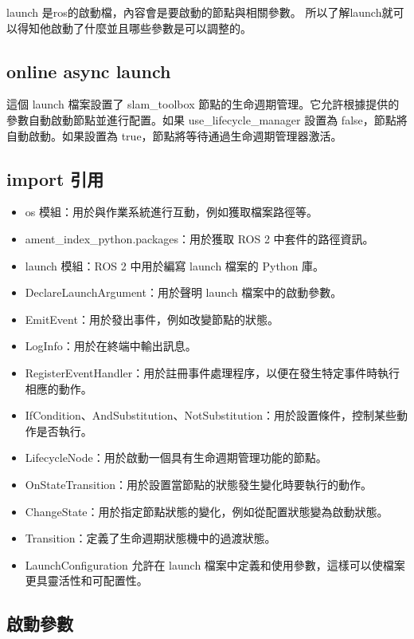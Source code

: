 launch 是ros的啟動檔，內容會是要啟動的節點與相關參數。
所以了解launch就可以得知他啟動了什麼並且哪些參數是可以調整的。
\subsection{online async launch}

這個 launch 檔案設置了 slam\_toolbox 節點的生命週期管理。它允許根據提供的參數自動啟動節點並進行配置。如果 use\_lifecycle\_manager 設置為 false，節點將自動啟動。如果設置為 true，節點將等待通過生命週期管理器激活。
\subsection{import 引用}
\begin{itemize}
    \item os 模組：用於與作業系統進行互動，例如獲取檔案路徑等。
    \item ament\_index\_python.packages：用於獲取 ROS 2 中套件的路徑資訊。
    \item launch 模組：ROS 2 中用於編寫 launch 檔案的 Python 庫。
    \item DeclareLaunchArgument：用於聲明 launch 檔案中的啟動參數。
    \item EmitEvent：用於發出事件，例如改變節點的狀態。
    \item LogInfo：用於在終端中輸出訊息。
    \item RegisterEventHandler：用於註冊事件處理程序，以便在發生特定事件時執行相應的動作。
    \item IfCondition、AndSubstitution、NotSubstitution：用於設置條件，控制某些動作是否執行。
    \item LifecycleNode：用於啟動一個具有生命週期管理功能的節點。
    \item OnStateTransition：用於設置當節點的狀態發生變化時要執行的動作。
    \item ChangeState：用於指定節點狀態的變化，例如從配置狀態變為啟動狀態。
    \item Transition：定義了生命週期狀態機中的過渡狀態。
    \item LaunchConfiguration 允許在 launch 檔案中定義和使用參數，這樣可以使檔案更具靈活性和可配置性。
\end{itemize}

\subsection{啟動參數}

